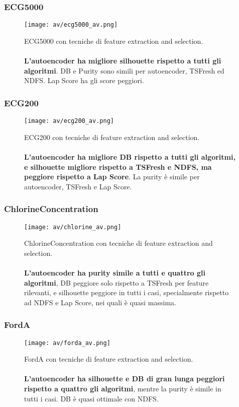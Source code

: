 \subsubsection{ECG5000}
\begin{figure}[H]
	\centering
	\texttt{[image: av/ecg5000\_av.png]}
	\caption{ECG5000 con tecniche di feature extraction and selection.\\
	\\
	\textbf{L'autoencoder ha migliore silhouette rispetto a tutti gli algoritmi}. DB e Purity sono simili per autoencoder, TSFresh ed NDFS. Lap Score ha gli score peggiori.}
	\label{fig:ecg5000_av}
\end{figure}

\subsubsection{ECG200}
\begin{figure}[H]
	\centering
	\texttt{[image: av/ecg200\_av.png]}
	\caption{ECG200 con tecniche di feature extraction and selection.\\
	\\
	\textbf{L'autoencoder ha migliore DB rispetto a tutti gli algoritmi, e silhouette migliore rispetto a TSFresh e NDFS, ma peggiore rispetto a Lap Score}. La purity è simile per autoencoder, TSFresh e Lap Score.}
	\label{fig:ecg200_av}
\end{figure}

\subsubsection{ChlorineConcentration}
\begin{figure}[H]
	\centering
	\texttt{[image: av/chlorine\_av.png]}
	\caption{ChlorineConcentration con tecniche di feature extraction and selection.\\
	\\
	\textbf{L'autoencoder ha purity simile a tutti e quattro gli algoritmi}, DB peggiore solo rispetto a TSFresh per feature rilevanti, e silhouette peggiore in tutti i casi, specialmente rispetto ad NDFS e Lap Score, nei quali è quasi massima.}
	\label{fig:chlorine_av}
\end{figure}

\subsubsection{FordA}
\begin{figure}[H]
	\centering
	\texttt{[image: av/forda\_av.png]}
	\caption{FordA con tecniche di feature extraction and selection.\\
	\\
	\textbf{L'autoencoder ha silhouette e DB di gran lunga peggiori rispetto a quattro gli algoritmi}, mentre la purity è simile in tutti i casi. DB è quasi ottimale con NDFS.}
	\label{fig:forda_av}
\end{figure}

